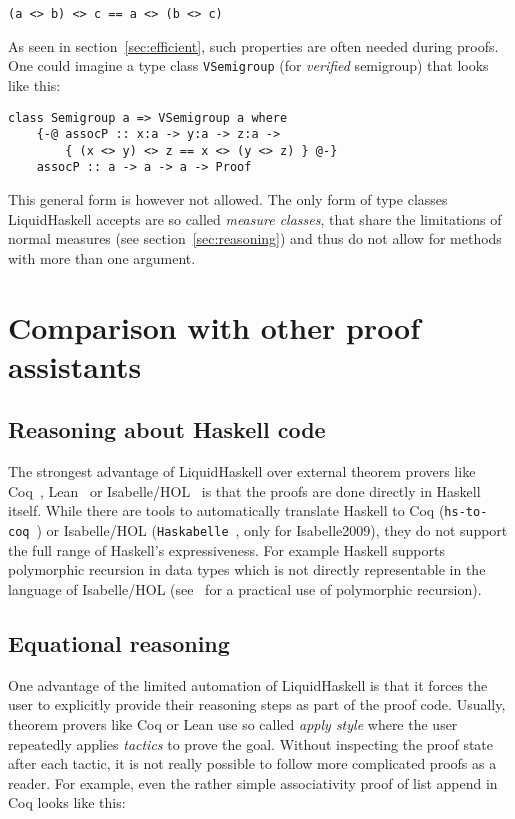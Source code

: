 \documentclass[acmlarge,screen,authorversion=true,nonacm=true]{acmart}
\begin{document}
\begin{lstlisting}
(a <> b) <> c == a <> (b <> c)
\end{lstlisting}

As seen in section~\ref{sec:efficient}, such properties are often needed during proofs. One could imagine a type class \texttt{VSemigroup} (for \textit{verified} semigroup) that looks like this:

\begin{lstlisting}
class Semigroup a => VSemigroup a where
    {-@ assocP :: x:a -> y:a -> z:a ->
        { (x <> y) <> z == x <> (y <> z) } @-}
    assocP :: a -> a -> a -> Proof
\end{lstlisting}

This general form is however not allowed. The only form of type classes LiquidHaskell accepts are so called \textit{measure classes}, that share the limitations of normal measures (see section~\ref{sec:reasoning}) and thus do not allow for methods with more than one argument.

\section{Comparison with other proof assistants}\label{sec:comparison}

\subsection{Reasoning about Haskell code}

The strongest advantage of LiquidHaskell over external theorem provers like Coq~\cite{coq}, Lean~\cite{lean} or Isabelle/HOL~\cite{isabelle} is that the proofs are done directly in Haskell itself. While there are tools to automatically translate Haskell to Coq (\texttt{hs-to-coq}~\cite{hs-to-coq}) or Isabelle/HOL (\texttt{Haskabelle}~\cite{haskabelle}, only for Isabelle2009), they do not support the full range of Haskell's expressiveness. For example Haskell supports polymorphic recursion in data types which is not directly representable in the language of Isabelle/HOL (see~\cite{amortized} for a practical use of polymorphic recursion).

\subsection{Equational reasoning}

One advantage of the limited automation of LiquidHaskell is that it forces the user to explicitly provide their reasoning steps as part of the proof code. Usually, theorem provers like Coq or Lean use so called \textit{apply style} where the user repeatedly applies \textit{tactics} to prove the goal. Without inspecting the proof state after each tactic, it is not really possible to follow more complicated proofs as a reader. For example, even the rather simple associativity proof of list append in Coq looks like this:
\end{document}
